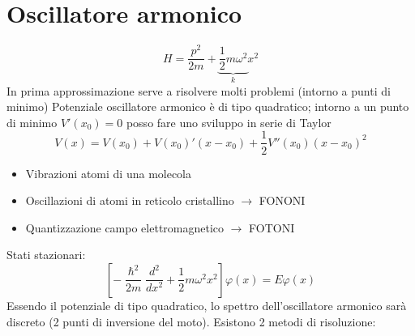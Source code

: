 \chapter{Oscillatore armonico}

\begin{equation*}
    H = \frac{p^2}{2m} + \underbrace{\frac{1}{2} m \omega^2}_k x^2
\end{equation*}
In prima approssimazione serve a risolvere molti problemi (intorno a punti di minimo) \newline
Potenziale oscillatore armonico è di tipo quadratico; intorno a un punto di minimo \( V'(x_0)=0 \) posso fare uno sviluppo in serie di Taylor
\begin{equation*}
    V(x) = V(x_0) + V(x_0)'(x-x_0) + \frac{1}{2}V''(x_0){(x-x_0)}^2
\end{equation*}
\begin{itemize}
    \item Vibrazioni atomi di una molecola
    \item Oscillazioni di atomi in reticolo cristallino \( \rightarrow\) FONONI
    \item Quantizzazione campo elettromagnetico \(\rightarrow\) FOTONI
\end{itemize}
Stati stazionari:
\begin{equation*}
    \left[-\frac{\hslash^2}{2m}\frac{d^2}{dx^2} + \frac{1}{2}m\omega^2 x^2  \right] \varphi(x) = E\varphi(x)
\end{equation*}
Essendo il potenziale di tipo quadratico, lo spettro dell'oscillatore armonico sarà discreto (2 punti di inversione del moto). \newline
Esistono 2 metodi di risoluzione:
